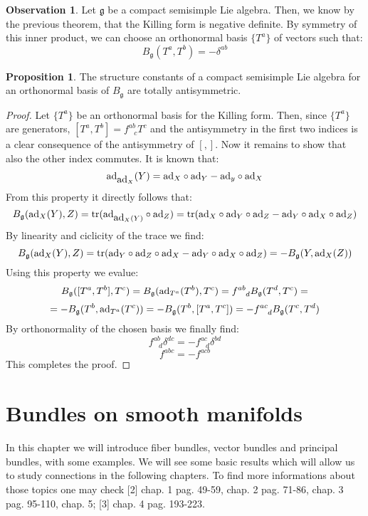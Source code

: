 \documentclass[12pt,a4paper]{report}
\theoremstyle{definition}
\theoremstyle{Theorem}
\newtheorem{Prop}[Def]{Proposition}
\theoremstyle{definition}
\theoremstyle{definition}
\newtheorem{Obs}[Def]{Observation}
\begin{document}
	\begin{Obs}
		Let $\mathfrak{g}$ be a compact semisimple Lie algebra. Then, we know by the previous theorem, that the Killing form is negative definite. By symmetry of this inner product, we can choose an orthonormal basis $\{T^a\}$ of vectors such that:
		$$B_{\mathfrak{g}}(T^a,T^b)=-\delta^{ab}$$
	\end{Obs}
	\begin{Prop}
		The structure constants of a compact semisimple Lie algebra for an orthonormal basis of $B_\mathfrak{g}$ are totally antisymmetric.
	\end{Prop}
	\begin{proof}
		Let $\{T^a\}$ be an orthonormal basis for the Killing form. Then, since $\{T^a\}$ are generators, $[T^a,T^b]=f^{ab}_{\hspace{9pt}c}T^c$ and the antisymmetry in the first two indices is a clear consequence of the antisymmetry of $[,]$. Now it remains to show that also the other index commutes. It is known that:
		$$\hbox{ad}_{\hbox{ad}_X}(Y)=\hbox{ad}_X\circ \hbox{ad}_Y-\hbox{ad}_y\circ \hbox{ad}_X$$
		From this property it directly follows that:
		$$B_\mathfrak{g}(\hbox{ad}_X(Y),Z)=\hbox{tr}(\hbox{ad}_{\hbox{ad}_X(Y)}\circ \hbox{ad}_Z)=\hbox{tr}(\hbox{ad}_X\circ \hbox{ad}_Y\circ \hbox{ad}_Z-\hbox{ad}_Y\circ\hbox{ad}_X\circ \hbox{ad}_Z)$$
		By linearity and ciclicity of the trace we find:
		$$B_\mathfrak{g}(\hbox{ad}_X(Y),Z)=\hbox{tr}(\hbox{ad}_Y\circ \hbox{ad}_Z\circ \hbox{ad}_X-\hbox{ad}_Y\circ\hbox{ad}_X\circ \hbox{ad}_Z)=-B_\mathfrak{g}(Y,\hbox{ad}_X(Z))$$
		Using this property we evalue:
		$$B_\mathfrak{g}([T^a,T^b],T^c)=B_\mathfrak{g}(\hbox{ad}_{T^a}(T^b),T^c)=f^{ab}_{\hspace{9pt}d}B_\mathfrak{g}(T^d,T^c)=$$
		$$=-B_\mathfrak{g}(T^b,\hbox{ad}_{T^a}(T^c))=-B_\mathfrak{g}(T^b,[T^a,T^c])=-f^{ac}_{\hspace{9pt}d}B_\mathfrak{g}(T^c,T^d)$$
		By orthonormality of the chosen basis we finally find:
		$$f^{ab}_{\hspace{9pt}d}\delta^{dc}=-f^{ac}_{\hspace{9pt}d}\delta^{bd}$$
		$$f^{abc}=-f^{acb}$$
		This completes the proof.
	\end{proof}
	\chapter{Bundles on smooth manifolds}
	In this chapter we will introduce fiber bundles, vector bundles and principal bundles, with some examples. We will see some basic results which will allow us to study connections in the following chapters. To find more informations about those topics one may check [2] chap. 1 pag. 49-59, chap. 2 pag. 71-86, chap. 3 pag. 95-110, chap. 5; [3] chap. 4 pag. 193-223.
\end{document}
